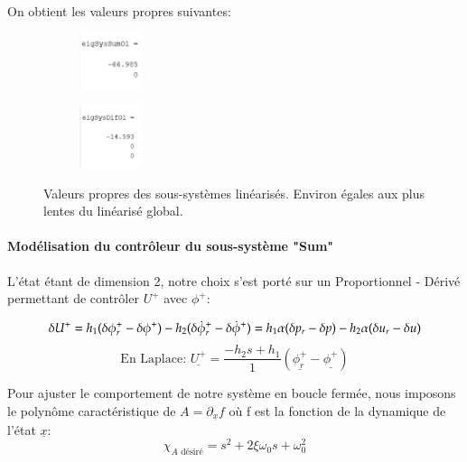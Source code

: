 \documentclass{report}
\begin{document}
On obtient les valeurs propres suivantes:

\begin{figure}[h]  %
    \begin{subfigure}{.5\textwidth}
        \centering
        \includegraphics[width=0.2\textwidth]{figures/eigSysSumOl.png}        
      \end{subfigure}    
      \begin{subfigure}{.5\textwidth}
        \centering
        \includegraphics[width=0.2\textwidth]{figures/eigSysDifOl.png}
      \end{subfigure}    
      \caption{Valeurs propres des sous-systèmes linéarisés. 
      Environ égales aux plus lentes du linéarisé global.}
\end{figure}

\paragraph{Modélisation du contrôleur du sous-système "Sum"}

L'état étant de dimension 2, notre choix s'est porté sur un Proportionnel
- Dérivé permettant de contrôler $U^+$ avec $\phi^+$:

\begin{equation*}
    \delta{U^+} = h_1(\delta \phi^+_r - \delta \phi^+) 
    - h_2(\delta \dot{\phi}^+_r - \delta \dot{\phi}^+) \\     
    =h_1\alpha( \delta p_r - \delta p) 
    - h_2\alpha( \delta u_r - \delta u)
\end{equation*}
\begin{equation*}
    \text{En Laplace: }
    \underline{U^+} = \frac{-h_2s + h_1}{1}
    (\underline{\phi^+_r} -\underline{\phi^+})
\end{equation*}

Pour ajuster le comportement de notre système en boucle fermée, nous 
imposons le polynôme caractéristique de $A = \partial_{\underline{x}} f$
où f est la fonction de la dynamique de l'état $\underline{x}$:
\begin{equation*}
    \chi_{A \text{ désiré}} = s^2 + 2\xi\omega_0 s + \omega_0^2
\end{equation*}
\end{document}
